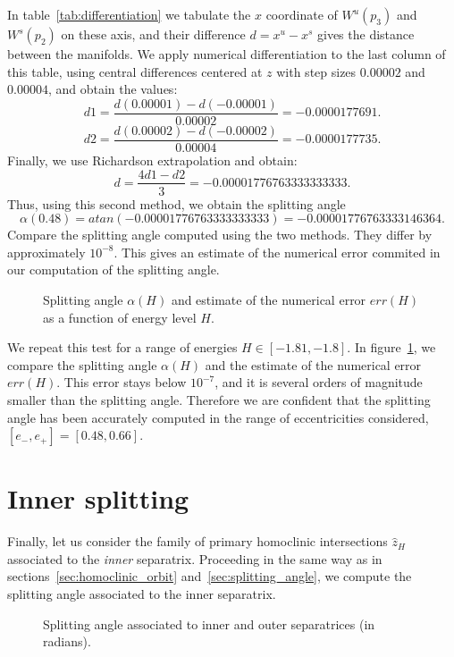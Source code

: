 \documentclass[a4paper]{amsart}
\theoremstyle{remark}
\begin{document}
In table~\ref{tab:differentiation} we tabulate the $x$ coordinate of
$W^u(p_3)$ and $W^s(p_2)$ on these axis, and their difference
$d=x^u-x^s$ gives the distance between the manifolds.
We apply numerical differentiation to the last column of this table,
using central differences centered at $z$ with step sizes $0.00002$
and $0.00004$, and obtain the values:
\[ d1 = \frac{d(0.00001) - d(-0.00001)}{0.00002} =
-0.0000177691.\]
\[ d2 = \frac{d(0.00002) - d(-0.00002)}{0.00004} =
-0.0000177735.\]
Finally, we use Richardson extrapolation and obtain:
\[ d = \frac{4 d1-d2}{3} = -0.00001776763333333333. \]
Thus, using this second method, we obtain the splitting angle
\[ \alpha(0.48) = atan(-0.00001776763333333333) =
-0.00001776763333146364. \]
Compare the splitting angle computed using the two methods. They
differ by approximately $10^{-8}$.
This gives an estimate of the numerical error commited in our
computation of the splitting angle.

\begin{figure}
\caption{Splitting angle $\alpha(H)$ and estimate of the numerical
error $err(H)$ as a function of energy level $H$.}
\label{fig:diffs}
\end{figure}

We repeat this test for a range of energies $H\in[-1.81,-1.8]$. 
In figure~\ref{fig:diffs}, we compare the splitting angle $\alpha(H)$
and the estimate of the numerical error $err(H)$. This error stays
below $10^{-7}$, and it is several orders of magnitude smaller than
the splitting angle. 
Therefore we are confident that the splitting angle has been accurately
computed in the range of eccentricities considered,
$[e_-,e_+]=[0.48,0.66]$.

\section{Inner splitting} \label{sec:inner_splitting}

Finally, let us consider the family of primary homoclinic
intersections ${\hat z}_H$ associated to the \emph{inner} separatrix. 
Proceeding in the same way as in sections~\ref{sec:homoclinic_orbit}
and~\ref{sec:splitting_angle}, we compute the splitting angle
associated to the inner separatrix.

\begin{figure}
\caption{Splitting angle associated to inner and outer separatrices
(in radians).}
\label{fig:splittings}
\end{figure}
\end{document}
